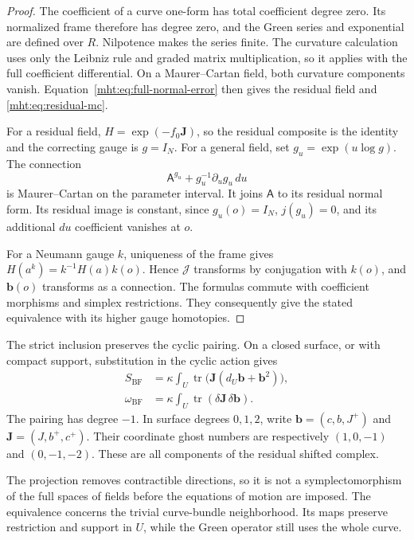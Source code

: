 \begin{proof}
The coefficient of a curve one-form has total coefficient degree zero.
Its normalized frame therefore has degree zero, and the Green series
and exponential are defined over $R$. Nilpotence makes the series
finite. The curvature calculation uses only the Leibniz rule and graded
matrix multiplication, so it applies with the full coefficient
differential. On a Maurer--Cartan field, both curvature components
vanish. Equation~\eqref{mht:eq:full-normal-error} then gives the residual
field and \eqref{mht:eq:residual-mc}.

For a residual field, $H=\exp(-f_0\mathbf J)$, so the residual composite
is the identity and the correcting gauge is $g=I_N$.
For a general field, set $g_u=\exp(u\log g)$.
The connection
\[
 \mathsf A^{g_u}+g_u^{-1}\partial_ug_u\,du
\]
is Maurer--Cartan on the parameter interval. It joins $\mathsf A$ to
its residual normal form. Its residual image is constant, since
$g_u(o)=I_N$, $j(g_u)=0$, and its additional $du$ coefficient vanishes
at $o$.

For a Neumann gauge $k$, uniqueness of the frame gives
$H(a^k)=k^{-1}H(a)k(o)$. Hence $\mathcal J$ transforms by conjugation
with $k(o)$, and $\mathbf b(o)$ transforms as a connection.
The formulas commute with coefficient morphisms and simplex
restrictions. They consequently give the stated equivalence with its
higher gauge homotopies.
\end{proof}

The strict inclusion preserves the cyclic pairing. On a closed surface,
or with compact support, substitution in the cyclic action gives
\begin{align}
 S_{\mathrm{BF}}
   &=\kappa\int_U\operatorname{tr}
             \bigl(\mathbf J(d_U\mathbf b+\mathbf b^2)\bigr),
       \label{mht:eq:residual-bv-action}\\
 \omega_{\mathrm{BF}}
   &=\kappa\int_U\operatorname{tr}
                      (\delta\mathbf J\,\delta\mathbf b).
       \label{mht:eq:residual-bv-pairing}
\end{align}
The pairing has degree $-1$. In surface degrees $0,1,2$, write
$\mathbf b=(c,b,J^+)$ and $\mathbf J=(J,b^+,c^+)$.
Their coordinate ghost numbers are respectively $(1,0,-1)$ and
$(0,-1,-2)$. These are all components of the residual shifted complex.

The projection removes contractible directions, so it is not a
symplectomorphism of the full spaces of fields before the equations of
motion are imposed. The equivalence concerns the trivial curve-bundle
neighborhood. Its maps preserve restriction and support in $U$, while
the Green operator still uses the whole curve.

